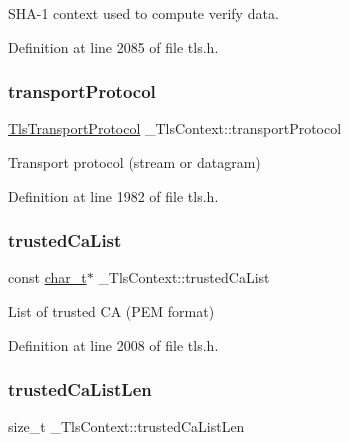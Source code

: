 S\+H\+A-\/1 context used to compute verify data. 



Definition at line 2085 of file tls.\+h.

\mbox{\label{struct__TlsContext_ad7b069461b31df5cc25d98ea65147000}} 
\subsubsection{\texorpdfstring{transport\+Protocol}{transportProtocol}}
{\footnotesize\ttfamily \hyperlink{tls_8h_a25cb7e3df9004160eb21eac9377dc89f}{Tls\+Transport\+Protocol} \+\_\+\+Tls\+Context\+::transport\+Protocol}



Transport protocol (stream or datagram) 



Definition at line 1982 of file tls.\+h.

\mbox{\label{struct__TlsContext_ace5d3291f2eed9b075ad55f624d81fb9}} 
\subsubsection{\texorpdfstring{trusted\+Ca\+List}{trustedCaList}}
{\footnotesize\ttfamily const \hyperlink{compiler__port_8h_a40bb5262bf908c328fbcfbe5d29d0201}{char\+\_\+t}$\ast$ \+\_\+\+Tls\+Context\+::trusted\+Ca\+List}



List of trusted CA (P\+EM format) 



Definition at line 2008 of file tls.\+h.

\mbox{\label{struct__TlsContext_a5360844cbf77cacbfb368cb9433f9250}} 
\subsubsection{\texorpdfstring{trusted\+Ca\+List\+Len}{trustedCaListLen}}
{\footnotesize\ttfamily size\+\_\+t \+\_\+\+Tls\+Context\+::trusted\+Ca\+List\+Len}



